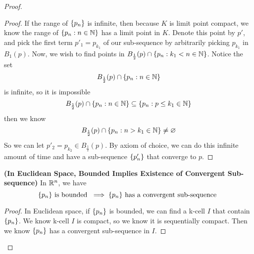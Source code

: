 \documentclass{report}
\begin{document}
\begin{proof}
\begin{proof}
If the range of $\{ p_n \}$ is infinite, then because $K$ is limit point compact, we know  the range of  $\{ p_n:n\in\mathbb{N} \}$ has a limit point in $K$. Denote this point  by $p'$, and pick the first term $p'_1=p_{k_1}$ of our sub-sequence by arbitrarily picking  $p_{k_1}$ in  $B_1(p)$. Now, we wish to find points in $B_{\frac{1}{2}}(p)\cap \{ p_n:k_1<n\in\mathbb{N} \}$. Notice the set
\begin{equation}
B_{\frac{1}{2}}(p)\cap \{ p_n:n\in\mathbb{N} \}
\end{equation}
is infinite, so  it is impossible
\begin{equation}
B_{\frac{1}{2}}(p)\cap \{ p_n:n\in\mathbb{N} \}\subseteq \{ p_n:p\leq k_1\in\mathbb{N} \}
\end{equation}
then we know 
\begin{equation}
\text{ $B_{\frac{1}{2}}(p)\cap \{ p_n:n>k_1\in\mathbb{N} \}\neq \varnothing$  }
\end{equation}
So we can let $p'_2=p_{k_2}\in B_{\frac{1}{2}}(p)$. By axiom of choice, we can do this infinite amount of time and have a sub-sequence $\{ p'_n \}$ that converge to $p$.
\end{proof}
\begin{theorem}
\label{3.8.8}
\textbf{(In Euclidean Space, Bounded Implies Existence of Convergent Sub-sequence)} In $\mathbb{R}^n$, we have
 \begin{equation}
\{ p_n \}\text{ is bounded }\implies \{ p_n \}\text{ has a convergent sub-sequence }
\end{equation}
\end{theorem}
\begin{proof}
In Euclidean space, if $\{ p_n \}$ is bounded, we can find a k-cell $I$ that contain  $\{ p_n \}$. We know k-cell $I$ is compact, so we know it is sequentially compact. Then we know  $\{ p_n \}$ has a convergent sub-sequence in $I$. 
\end{proof}

\end{proof}
\end{document}
